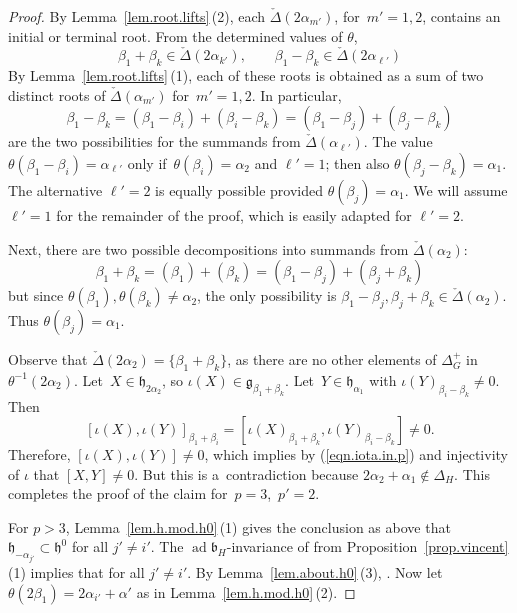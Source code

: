 \documentclass[10pt,a4paper]{amsart}
\numberwithin{equation}{section}
\theoremstyle{definition}
\newcommand{\lieg}{\mathfrak{g}}
\newcommand{\lieh}{\mathfrak{h}}
\def\b{{\mathfrak b}}
\newcommand{\ad}{\operatorname{ad}}
\begin{document}
\begin{proof}
By Lemma~\ref{lem.root.lifts}\,(2), each $\check{\Delta}(2 \alpha_{m'})$, for~${m'=1,2}$, contains an initial or terminal root. From the determined values of $\theta$,
\[ \beta_1 + \beta_k \in \check{\Delta}(2 \alpha_{k'}), \qquad \beta_1 - \beta_k \in \check{\Delta}(2 \alpha_{\ell'}) \]
By Lemma~\ref{lem.root.lifts}\,(1), each of these roots is obtained as a sum of two distinct roots of $\check{\Delta}(\alpha_{m'})$ for~${m'=1,2}$. In particular,
\[\beta_1 - \beta_k = (\beta_1 - \beta_i) + (\beta_i - \beta_k) = (\beta_1 - \beta_j) + (\beta_j - \beta_k)\]
are the two possibilities for the summands from $\check{\Delta}(\alpha_{\ell'})$. The value $\theta(\beta_1 - \beta_i) = \alpha_{\ell'}$
only if~${\theta(\beta_i) = \alpha_2}$ and $\ell'=1$;
then also $\theta(\beta_j- \beta_k) = \alpha_1$. The alternative $\ell'=2$ is equally possible provided $\theta(\beta_j) = \alpha_1$. We will assume $\ell'=1$ for the remainder of the proof, which is easily adapted for $\ell'=2$.

Next, there are two possible decompositions into summands from $\check{\Delta}(\alpha_{2})$:
\[ \beta_1 + \beta_k = (\beta_1) + (\beta_k) = (\beta_1 - \beta_j) + (\beta_j + \beta_k)\]
but since $\theta(\beta_1), \theta(\beta_k) \neq \alpha_2$, the only possibility is $\beta_1 - \beta_j, \beta_j + \beta_k \in \check{\Delta}(\alpha_2)$. Thus $\theta(\beta_j) = \alpha_1$.

Observe that $\check{\Delta}(2 \alpha_2) = \{ \beta_1 + \beta_k \}$, as there are no other elements of $\Delta_G^+$ in $\theta^{-1}(2 \alpha_2)$. Let~${X \in \lieh_{2 \alpha_2}}$, so $\iota(X) \in \lieg_{\beta_1 + \beta_k}$. Let~${Y \in \lieh_{\alpha_1}}$ with $\iota(Y)_{\beta_i - \beta_k} \neq 0$. Then
\[[\iota(X), \iota(Y)]_{\beta_1 + \beta_i} = [\iota(X)_{\beta_1 + \beta_k} , \iota(Y)_{\beta_i - \beta_k}] \neq 0.\]
Therefore, $[\iota(X), \iota(Y)] \neq 0$, which implies by (\ref{eqn.iota.in.p}) and injectivity of $\iota$ that $[X,Y] \neq 0$. But this is a~contradiction because $2 \alpha_2 + \alpha_1 \notin \Delta_H$. This completes the proof of the claim for~${p=3}$,~${p'=2}$.

For $p > 3$, Lemma~\ref{lem.h.mod.h0}\,(1) gives the conclusion as above that $\lieh_{- \alpha_{j'}} \subset \lieh^0$ for all $j'\neq i'$. The $\ad \b_H$-invariance of \smash{$\lieh^0$} from Proposition~\ref{prop.vincent}\,(1) implies that \smash{$\lieh_{ \alpha_{j'}} \subset \lieh^0$} for all $j' \neq i'$. By Lemma~\ref{lem.about.h0}\,(3), \smash{$\lieh_{- \alpha_{i'}} \cap \lieh^0 = 0$}.
Now
let $\theta(2 \beta_1) = 2 \alpha_{i'} + \alpha'$
as in Lemma~\ref{lem.h.mod.h0}\,(2).


\end{proof}
\end{document}
